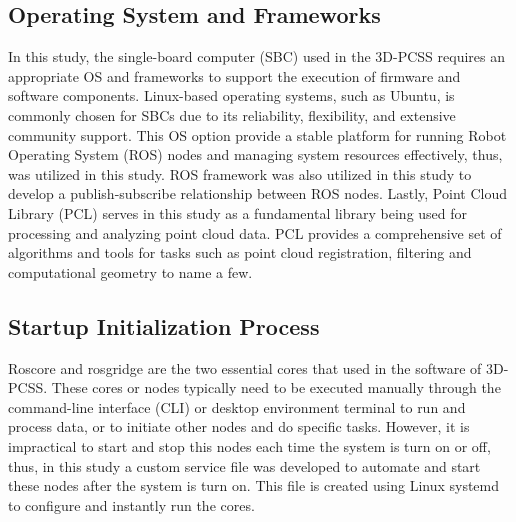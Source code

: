\subsection{Operating System and Frameworks}

In this study, the single-board computer (SBC) used in the 3D-PCSS requires an appropriate OS and frameworks to support the execution of firmware and software components. Linux-based operating systems, such as Ubuntu, is commonly chosen for SBCs due to its reliability, flexibility, and extensive community support. This OS option provide a stable platform for running Robot Operating System (ROS) nodes and managing system resources effectively, thus, was utilized in this study. ROS framework was also utilized in this study to develop a publish-subscribe relationship between ROS nodes. Lastly, Point Cloud Library (PCL) serves in this study as a fundamental library being used for processing and analyzing point cloud data. PCL provides a comprehensive set of algorithms and tools for tasks such as point cloud registration, filtering and computational geometry to name a few.

\subsection{Startup Initialization Process}
Roscore and rosgridge are the two essential cores that used in the software of 3D-PCSS. These cores or nodes typically need to be executed manually through the command-line interface (CLI) or desktop environment terminal to run and process data, or to initiate other nodes and do specific tasks. However, it is impractical to start and stop this nodes each time the system is turn on or off, thus, in this study a custom service file was developed to automate and start these nodes after the system is turn on. This file is created using Linux systemd to configure and instantly run the cores.


